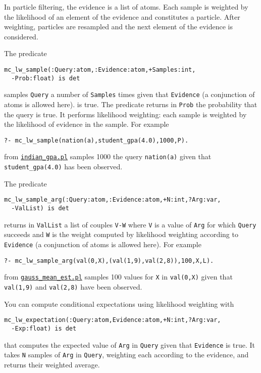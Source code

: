 In particle filtering, the evidence is a list of atoms. Each sample is weighted by the
likelihood of an element of the evidence and constitutes a particle.
After weighting, particles are resampled and the next element of the evidence
is considered.

 The predicate
\begin{verbatim}
mc_lw_sample(:Query:atom,:Evidence:atom,+Samples:int,
  -Prob:float) is det
\end{verbatim}
samples \verb|Query|  a number of \verb|Samples| times given that \verb|Evidence|
(a conjunction of atoms is allowed here). is true.
The predicate returns in \verb|Prob| the probability that the query is true.
It performs likelihood weighting: each sample is weighted by the
likelihood of evidence in the sample.
For example
\begin{verbatim}
?- mc_lw_sample(nation(a),student_gpa(4.0),1000,P).
\end{verbatim}
from \href{http://cplint.eu/example/inference/indian_gpa.pl}{\texttt{indian\_gpa.pl}} samples 1000 the query
\verb|nation(a)| given that \verb|student_gpa(4.0)| has been observed.


 The predicate
\begin{verbatim}
mc_lw_sample_arg(:Query:atom,:Evidence:atom,+N:int,?Arg:var,
  -ValList) is det
\end{verbatim}
returns in \verb|ValList| a list of couples \verb|V-W| where \verb|V| is a value of \verb|Arg|
for which \verb|Query| succeeds and \verb|W| is the
weight computed by likelihood weighting
according to \verb|Evidence| (a conjunction of atoms is allowed here).
For example
\begin{verbatim}
?- mc_lw_sample_arg(val(0,X),(val(1,9),val(2,8)),100,X,L).
\end{verbatim}
from \href{http://cplint.eu/example/inference/gauss_mean_est.pl}{\texttt{gauss\_mean\_est.pl}} samples 100 values for \verb|X| in
\verb|val(0,X)| given that \verb|val(1,9)| and \verb|val(2,8)| have been observed.

You can compute conditional expectations using likelihood weighting with
\begin{verbatim}
mc_lw_expectation(:Query:atom,Evidence:atom,+N:int,?Arg:var,
  -Exp:float) is det
\end{verbatim}
that computes the expected value of \verb|Arg| in \verb|Query| given that
\verb|Evidence| is true.
It takes \verb|N| samples of  \verb|Arg| in \verb|Query|, weighting each according
to the evidence, and returns their weighted average.




